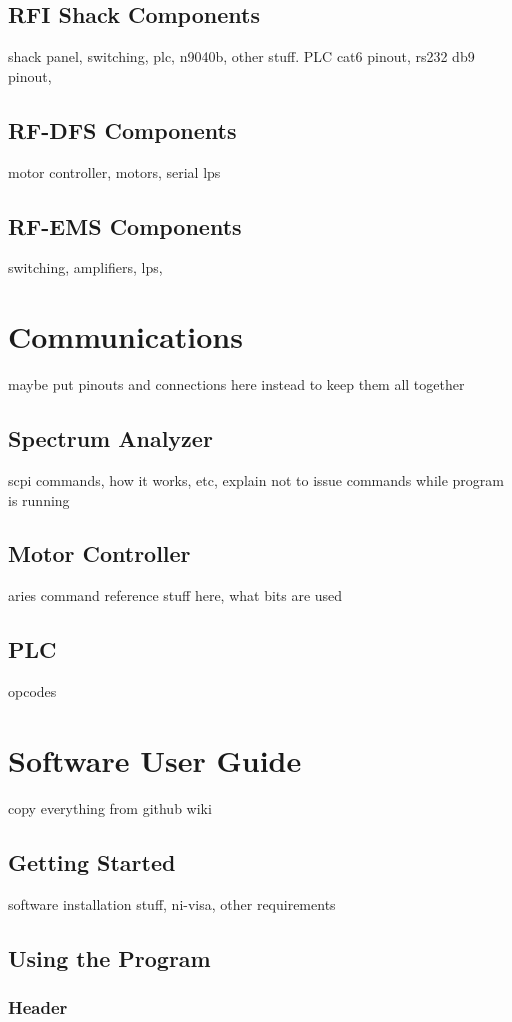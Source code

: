 \documentclass[titlepage]{article}
\begin{document}
\subsection{RFI Shack Components}
shack panel, switching, plc, n9040b, other stuff. PLC cat6 pinout, rs232 db9 pinout,
\subsection{RF-DFS Components}
motor controller, motors, serial lps
\subsection{RF-EMS Components}
switching, amplifiers, lps,

\section{Communications}
maybe put pinouts and connections here instead to keep them all together
\subsection{Spectrum Analyzer}
scpi commands, how it works, etc, explain not to issue commands while program is running
\subsection{Motor Controller}
aries command reference stuff here, what bits are used
\subsection{PLC}
opcodes

\section{Software User Guide}
copy everything from github wiki
\subsection{Getting Started}
software installation stuff, ni-visa, other requirements
\subsection{Using the Program}
\subsubsection{Header}
\end{document}
